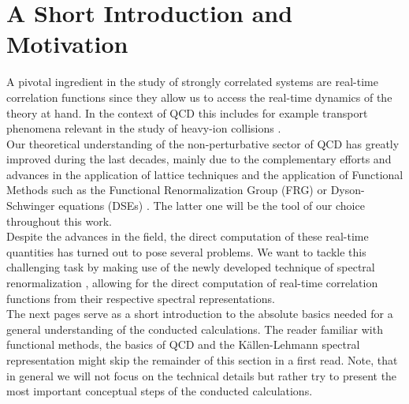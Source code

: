 \section{A Short Introduction and Motivation}
A pivotal ingredient in the study of strongly correlated systems are real-time correlation functions since they allow us to access the real-time dynamics of the theory at hand. In the context of QCD this includes for example transport phenomena relevant in the study of heavy-ion collisions \cite{AyikNorenbergWolschin1977, Xu2019}.\\  Our theoretical understanding of the non-perturbative sector of QCD has greatly improved during the last decades, mainly due to the complementary efforts and advances in the application of lattice techniques \cite{Philipsen2007, deForcrand2010} and the application of Functional Methods such as the Functional Renormalization Group (FRG) \cite{Wetterich1992, Pawlowski2005} or Dyson-Schwinger equations (DSEs) \cite{Dyson1949, Schwinger1951}. The latter one will be the tool of our choice throughout this work. \\
Despite the advances in the field, the direct computation of these real-time quantities has turned out to pose several problems. We want to tackle this challenging task by making use of the newly developed technique of spectral renormalization \cite{Horak2019, Wink2020, HorakPawlowskiWink2020}, allowing for the direct computation of real-time correlation functions from their respective spectral representations.\\
 The next pages serve as a short introduction to the absolute basics needed for a general understanding of the conducted calculations. The reader familiar with functional methods, the basics of QCD and the K\"allen-Lehmann spectral representation might skip the remainder of this section in a first read. Note, that in general we will not focus on the technical details but rather try to present the most important conceptual steps of the conducted calculations.
